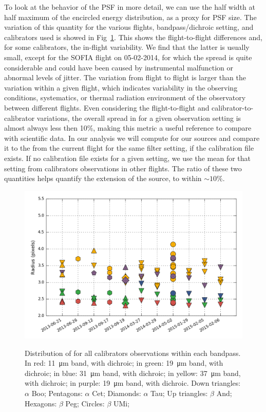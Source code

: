 To look at the behavior of the PSF in more detail, we can use the half width at half maximum of the encircled energy distribution, \Rfifty as a proxy for PSF size. The variation of this quantity for the various flights, bandpass/dichroic setting, and calibrators used is showed in Fig~\ref{fig:Rfifty_dist}. This shows the flight-to-flight differences and, for some calibrators, the in-flight variability. We find that the latter is usually small, except for the SOFIA flight on 05-02-2014, for which the spread is quite considerable and could have been caused by instrumental malfunction or abnormal levels of jitter. The variation from flight to flight is larger than the variation within a given flight, which indicates variability in the observing conditions, systematics, or thermal radiation environment of the observatory between different flights. Even considering the flight-to-flight and calibrator-to-calibrator variations, the overall spread in \Rfifty for a given observation setting is almost always less then 10\%, making this metric a useful reference to compare with scientific data. In our analysis we will compute \Rfifty for our sources and compare it to the \Rfifty from the current flight for the same filter setting, if the calibration file exists. If no calibration file exists for a given setting, we use the mean \Rfifty for that setting from calibrators observations in other flights. The ratio \Rpercent of these two quantities helps quantify the extension of the source, to within $\sim 10\%$. 

\begin{figure}[!h]
\begin{center}
\includegraphics[width=\textwidth]{Figures/R50.png}
\label{fig:Rfifty_dist}
\vspace{-0.5cm}

\caption[PSF size of calibrators]{Distribution of \Rfifty for all calibrators observations within each bandpass. In red: \SI{11}{\um} band, with dichroic; in green: \SI{19}{\um} band, with dichroic; in blue: \SI{31}{\um} band, with dichroic; in yellow: \SI{37}{\um} band, with dichroic; in purple: \SI{19}{\um} band, with dichroic. Down triangles: $\alpha$ Boo; Pentagons: $\alpha$ Cet; Diamonds: $\alpha$ Tau;  Up triangles: $\beta$ And; Hexagons: $\beta$ Peg; Circles: $\beta$ UMi;}
\end{center}
\end{figure}

